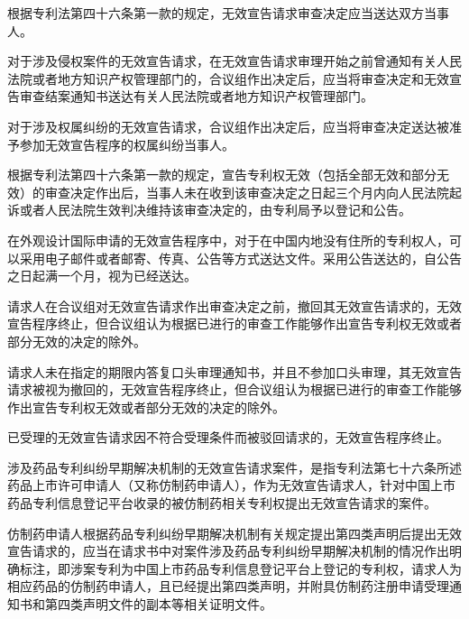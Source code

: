 {\setlength{\parindent}{20.6bp}根据专利法第四十六条第一款的规定，无效宣告请求审查决定应当送达双方当事人。\par}

{\setlength{\parindent}{20.6bp}对于涉及侵权案件的无效宣告请求，在无效宣告请求审理开始之前曾通知有关人民法院或者地方知识产权管理部门的，合议组作出决定后，应当将审查决定和无效宣告审查结案通知书送达有关人民法院或者地方知识产权管理部门。\par}

{\setlength{\parindent}{22.2bp}对于涉及权属纠纷的无效宣告请求，合议组作出决定后，应当将审查决定送达被准予参加无效宣告程序的权属纠纷当事人。\par}

根据专利法第四十六条第一款的规定，宣告专利权无效（包括全部无效和部分无效）的审查决定作出后，当事人未在收到该审查决定之日起三个月内向人民法院起诉或者人民法院生效判决维持该审查决定的，由专利局予以登记和公告。

在外观设计国际申请的无效宣告程序中，对于在中国内地没有住所的专利权人，可以采用电子邮件或者邮寄、传真、公告等方式送达文件。采用公告送达的，自公告之日起满一个月，视为已经送达。

请求人在合议组对无效宣告请求作出审查决定之前，撤回其无效宣告请求的，无效宣告程序终止，但合议组认为根据已进行的审查工作能够作出宣告专利权无效或者部分无效的决定的除外。

请求人未在指定的期限内答复口头审理通知书，并且不参加口头审理，其无效宣告请求被视为撤回的，无效宣告程序终止，但合议组认为根据已进行的审查工作能够作出宣告专利权无效或者部分无效的决定的除外。

已受理的无效宣告请求因不符合受理条件而被驳回请求的，无效宣告程序终止。

涉及药品专利纠纷早期解决机制的无效宣告请求案件，是指专利法第七十六条所述药品上市许可申请人（又称仿制药申请人），作为无效宣告请求人，针对中国上市药品专利信息登记平台收录的被仿制药相关专利权提出无效宣告请求的案件。

仿制药申请人根据药品专利纠纷早期解决机制有关规定提出第四类声明后提出无效宣告请求的，应当在请求书中对案件涉及药品专利纠纷早期解决机制的情况作出明确标注，即涉案专利为中国上市药品专利信息登记平台上登记的专利权，请求人为相应药品的仿制药申请人，且已经提出第四类声明，并附具仿制药注册申请受理通知书和第四类声明文件的副本等相关证明文件。

